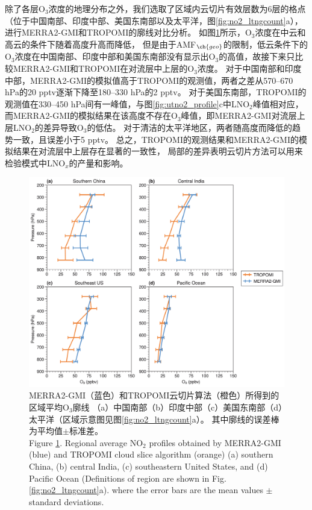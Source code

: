 除了各层O$_3$浓度的地理分布之外，我们选取了区域内云切片有效层数为6层的格点（位于中国南部、印度中部、美国东南部以及太平洋，图\ref{fig:no2_ltngcount}a），
进行MERRA2-GMI和TROPOMI的廓线对比分析。
如图\ref{fig:uto3_profile}所示，O$_3$浓度在中云和高云的条件下随着高度升高而降低，
但是由于AMF$_{\ch{geo}}$的限制，低云条件下的O$_3$浓度在中国南部、印度中部和美国东南部没有显示出O$_3$的高值，故接下来只比较MERRA2-GMI和TROPOMI在对流层中上层的O$_3$浓度。
对于中国南部和印度中部，MERRA2-GMI的模拟值高于TROPOMI的观测值，两者之差从570--670 hPa的20 pptv逐渐下降至180--330 hPa的2 pptv。
对于美国东南部，TROPOMI的观测值在330--450 hPa间有一峰值，与图\ref{fig:utno2_profile}c中LNO$_2$峰值相对应，
而MERRA2-GMI的模拟结果在该高度不存在O$_3$峰值，即MERRA2-GMI对流层上层LNO$_2$的差异导致O$_3$的低估。
对于清洁的太平洋地区，两者随高度而降低的趋势一致，且误差小于5 pptv。
总之，TROPOMI的观测结果和MERRA2-GMI的模拟结果在对流层中上层存在显著的一致性，
局部的差异表明云切片方法可以用来检验模式中LNO$_x$的产量和影响。



\begin{figure}[!htbp]
    \centering
    \includegraphics[width=13cm]{./figures/uto3_profile.png}
    \caption{
    MERRA2-GMI（蓝色）和TROPOMI云切片算法（橙色）所得到的区域平均O$_3$廓线
    （a）中国南部（b）印度中部（c）美国东南部（d）太平洋（区域示意图见图\ref{fig:no2_ltngcount}a）。
    其中廓线的误差棒为平均值$\pm$标准差。\\
    Figure \ref{fig:uto3_profile}. Regional average NO$_2$ profiles obtained by MERRA2-GMI (blue) and TROPOMI cloud slice algorithm (orange)
    (a) southern China, (b) central India, (c) southeastern United States, and (d) Pacific Ocean
    (Definitions of region are shown in Fig. \ref{fig:no2_ltngcount}a).
    where the error bars are the mean values $\pm$ standard deviations.
    }
    \label{fig:uto3_profile}
\end{figure}

